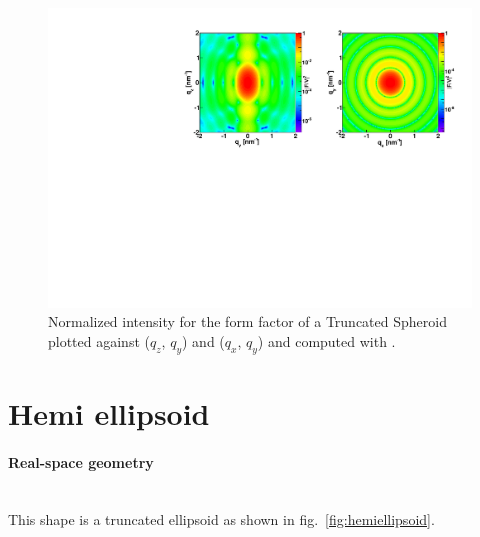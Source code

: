 \begin{figure}[ht]
\begin{center}
\includegraphics[angle=-90,width=\textwidth]{Figures/ff/figffspheroid.pdf}
\end{center}
\caption{Normalized intensity for the form factor of a Truncated Spheroid plotted against ($q_z$, $q_y$) and ($q_x$, $q_y$) and
  computed with .}
\label{fig:FFspheroidEx}
\end{figure}



\newpage
\section{Hemi ellipsoid}   

\paragraph{Real-space geometry}\mbox{}\\
This shape is a truncated ellipsoid as shown in fig.~\ref{fig:hemiellipsoid}.

